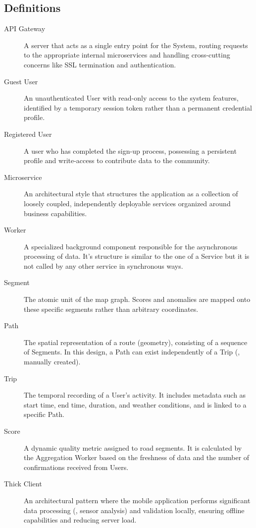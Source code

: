 \subsection{Definitions}
\begin{description}    
    \item[API Gateway] A server that acts as a single entry point for the System, routing requests to the appropriate internal microservices and handling cross-cutting concerns like SSL termination and authentication.
    
    \item[Guest User] An unauthenticated User with read-only access to the system features, identified by a temporary session token rather than a permanent credential profile.
    
    \item[Registered User] A user who has completed the sign-up process, possessing a persistent profile and write-access to contribute data to the community.
    
    \item[Microservice] An architectural style that structures the application as a collection of loosely coupled, independently deployable services organized around business capabilities.

    \item[Worker] A specialized background component responsible for the asynchronous processing of  data. It's structure is similar to the one of a Service but it is not called by any other service in synchronous ways.

    \item[Segment] The atomic unit of the map graph. Scores and anomalies are mapped onto these specific segments rather than arbitrary coordinates.
    
    \item[Path] The spatial representation of a route (geometry), consisting of a sequence of Segments. In this design, a Path can exist independently of a Trip (\ie, manually created).
    
    \item[Trip] The temporal recording of a User's activity. It includes metadata such as start time, end time, duration, and weather conditions, and is linked to a specific Path.
    
    \item[Score] A dynamic quality metric assigned to road segments. It is calculated by the Aggregation Worker based on the freshness of data and the number of confirmations received from Users.
    
    \item[Thick Client] An architectural pattern where the mobile application performs significant data processing (\eg, sensor analysis) and validation locally, ensuring offline capabilities and reducing server load.
\end{description}
